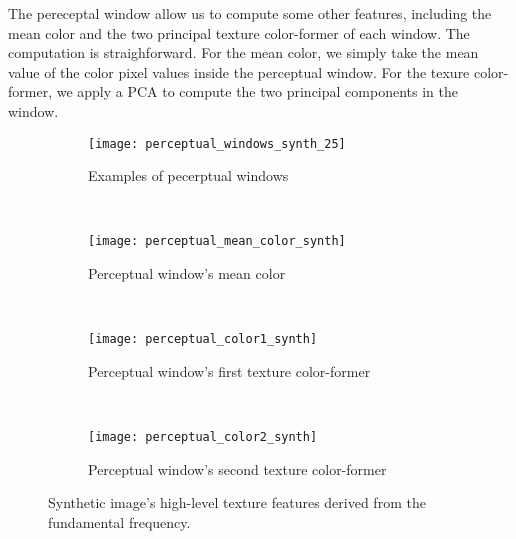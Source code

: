 The pereceptal window allow us to compute some other features, including the mean color and the two principal texture color-former of each window. The computation is straighforward. For the mean color, we simply take the mean value of the color pixel values inside the perceptual window. For the texure color-former, we apply a PCA to compute the two principal components in the window. 

\begin{figure}[!ht]
    \centering
    \begin{subfigure}[b]{\textwidth}
    	\texttt{[image: perceptual\_windows\_synth\_25]}
        \caption{Examples of pecerptual windows}
        \label{fig:perceptual_windows_synth_25}
    \end{subfigure}\\
    \begin{subfigure}[b]{\textwidth}
    	\texttt{[image: perceptual\_mean\_color\_synth]}
        \caption{Perceptual window's mean color}
        \label{fig:perceptual_mean_color_synth}
    \end{subfigure}\\
    \begin{subfigure}[b]{\textwidth}
    	\texttt{[image: perceptual\_color1\_synth]}
        \caption{Perceptual window's first texture color-former}
        \label{fig:perceptual_color1_synth}
    \end{subfigure}\\
    \begin{subfigure}[b]{\textwidth}
    	\texttt{[image: perceptual\_color2\_synth]}
        \caption{Perceptual window's second texture color-former}
        \label{fig:perceptual_color2_synth}
    \end{subfigure}    
                  
    \caption{Synthetic image's high-level texture features derived from the fundamental frequency.}\label{fig:colors_high_level_features_synth}    
\end{figure}


